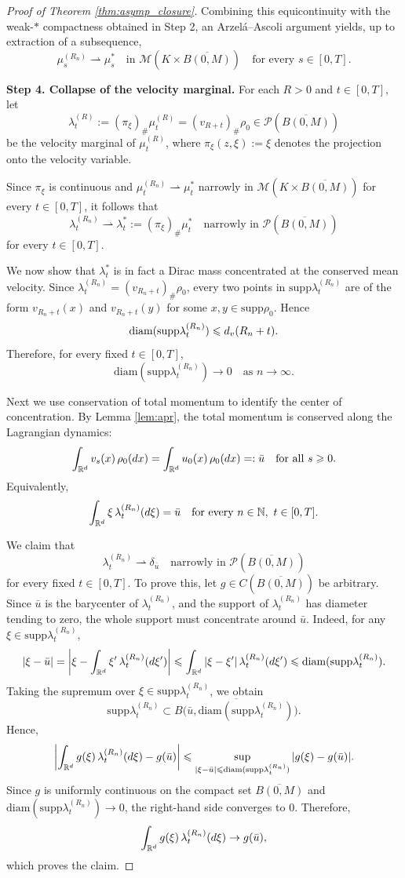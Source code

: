\documentclass[10pt,a4paper]{amsart}
\newcommand{\N}{\mathbb N}
\newcommand{\R}{\mathbb R}
\newcommand{\calM}{\mathcal M}
\newcommand{\calP}{\mathcal P}
\newcommand{\diam}{\text{diam}}
\newcommand{\dx}{\textnormal{d}x}
\renewcommand{\ge}{\geqslant}
\newcommand{\intr}{\int_{\R^d}}
\renewcommand{\le}{\leqslant}
\newcommand{\lt}{\left}
\newcommand{\rd}{\textnormal{d}}
\newcommand{\rt}{\right}
\newcommand{\supp}{\text{supp}}
\begin{document}
\begin{proof}[Proof of Theorem \ref{thm:asymp_closure}]
Combining this equicontinuity with the weak-$\ast$ compactness obtained in Step 2,
an Arzel\'a--Ascoli argument yields, up to extraction of a subsequence,
\[
\mu^{(R_n)}_s \rightharpoonup \mu^\ast_s
\quad\text{in }\calM(K\times\overline{B(0,M)})
\quad\text{for every } s\in[0,T].
\]

\medskip
\noindent\textbf{Step 4. Collapse of the velocity marginal.}
For each $R>0$ and $t\in[0,T]$, let
\[
\lambda^{(R)}_t := (\pi_\xi)_\#\mu^{(R)}_t = (v_{R+t})_\#\rho_0
\in \calP(\overline{B(0,M)})
\]
be the velocity marginal of $\mu^{(R)}_t$, where $\pi_\xi(z,\xi):=\xi$ denotes the projection onto the velocity variable.

Since $\pi_\xi$ is continuous and $\mu^{(R_n)}_t \rightharpoonup \mu^\ast_t$ narrowly in
$\calM(K\times\overline{B(0,M)})$ for every $t\in[0,T]$, it follows that
\[
\lambda^{(R_n)}_t \rightharpoonup \lambda^\ast_t := (\pi_\xi)_\#\mu^\ast_t
\quad\text{narrowly in }\calP(\overline{B(0,M)})
\]
for every $t\in[0,T]$.

We now show that $\lambda^\ast_t$ is in fact a Dirac mass concentrated at the conserved mean velocity. Since $\lambda^{(R_n)}_t=(v_{R_n+t})_\#\rho_0$, every two points in $\supp\lambda^{(R_n)}_t$
are of the form $v_{R_n+t}(x)$ and $v_{R_n+t}(y)$ for some $x,y\in\supp\rho_0$.
Hence
\[
\diam(\supp\lambda^{(R_n)}_t) \le \rd_v(R_n+t).
\]
Therefore, for every fixed $t\in[0,T]$,
\[
\diam(\supp\lambda^{(R_n)}_t)\to0 \quad\text{as }n\to\infty.
\]

Next we use conservation of total momentum to identify the center of concentration. By Lemma \ref{lem:apr}, 
the total momentum is conserved along the Lagrangian dynamics:
\[
\intr v_s(x)\,\rho_0(\dx)=\intr u_0(x)\,\rho_0(\dx)=:\bar u \quad\text{for all }s\ge0.
\]
Equivalently,
\[
\intr \xi\,\lambda^{(R_n)}_t(\rd\xi)=\bar u \quad\text{for every }n\in\N,\ t\in[0,T].
\]

We claim that
\[
\lambda^{(R_n)}_t \rightharpoonup \delta_{\bar u} \quad\text{narrowly in }\calP(\overline{B(0,M)})
\]
for every fixed $t\in[0,T]$.
To prove this, let $g\in C(\overline{B(0,M)})$ be arbitrary.
Since $\bar u$ is the barycenter of $\lambda^{(R_n)}_t$, and the support of $\lambda^{(R_n)}_t$
has diameter tending to zero, the whole support must concentrate around $\bar u$.
Indeed, for any $\xi\in\supp\lambda^{(R_n)}_t$,
\[
|\xi-\bar u|
=
\lt|\xi-\intr \xi'\,\lambda^{(R_n)}_t(\rd\xi')\rt|
\le
\intr |\xi-\xi'|\,\lambda^{(R_n)}_t(\rd\xi')
\le
\diam(\supp\lambda^{(R_n)}_t).
\]
Taking the supremum over $\xi\in\supp\lambda^{(R_n)}_t$, we obtain
\[
\supp\lambda^{(R_n)}_t \subset
\overline{B\bigl(\bar u,\diam(\supp\lambda^{(R_n)}_t)\bigr)}.
\]
Hence,
\[
\lt| \intr g(\xi)\,\lambda^{(R_n)}_t(\rd\xi)-g(\bar u) \rt|
\le
\sup_{|\xi-\bar u|\le \diam(\supp\lambda^{(R_n)}_t)}
|g(\xi)-g(\bar u)|.
\]
Since $g$ is uniformly continuous on the compact set $\overline{B(0,M)}$ and
$\diam(\supp\lambda^{(R_n)}_t)\to0$, the right-hand side converges to $0$.
Therefore,
\[
\intr g(\xi)\,\lambda^{(R_n)}_t(\rd\xi)\to g(\bar u),
\]
which proves the claim.


\end{proof}
\end{document}
